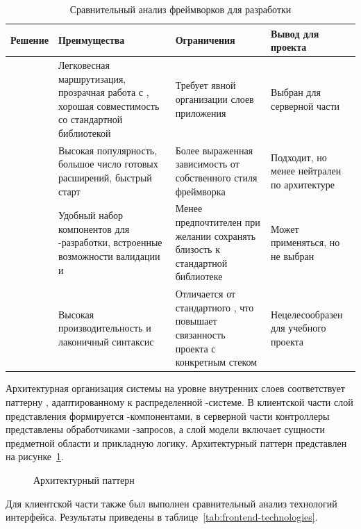 \begin{table}[H]
    \caption{Сравнительный анализ фреймворков для разработки}
    \label{tab:backend-frameworks}
    {\small
    \setlength{\tabcolsep}{4pt}
    \begin{tabularx}{\textwidth}{|P{0.18\textwidth}|L|L|L|}
        \hline
        Решение & Преимущества & Ограничения & Вывод для проекта \\
        \hline
         & Легковесная маршрутизация, прозрачная работа с , хорошая совместимость со стандартной библиотекой  & Требует явной организации слоев приложения & Выбран для серверной части \\
        \hline
         & Высокая популярность, большое число готовых расширений, быстрый старт & Более выраженная зависимость от собственного стиля фреймворка & Подходит, но менее нейтрален по архитектуре \\
        \hline
         & Удобный набор компонентов для -разработки, встроенные возможности валидации и  & Менее предпочтителен при желании сохранять близость к стандартной библиотеке & Может применяться, но не выбран \\
        \hline
         & Высокая производительность и лаконичный синтаксис & Отличается от стандартного , что повышает связанность проекта с конкретным стеком & Нецелесообразен для учебного проекта \\
        \hline
    \end{tabularx}
    }
\end{table}

Архитектурная организация системы на уровне внутренних слоев соответствует паттерну , адаптированному к распределенной -системе. В клиентской части слой представления формируется -компонентами, в серверной части контроллеры представлены обработчиками -запросов, а слой модели включает сущности предметной области и прикладную логику. Архитектурный паттерн  представлен на рисунке~\ref{fig:mvc-pattern}.

\begin{figure}[H]
    \centering
    \caption{Архитектурный паттерн }
    \label{fig:mvc-pattern}
\end{figure}

Для клиентской части также был выполнен сравнительный анализ технологий интерфейса. Результаты приведены в таблице~\ref{tab:frontend-technologies}.

